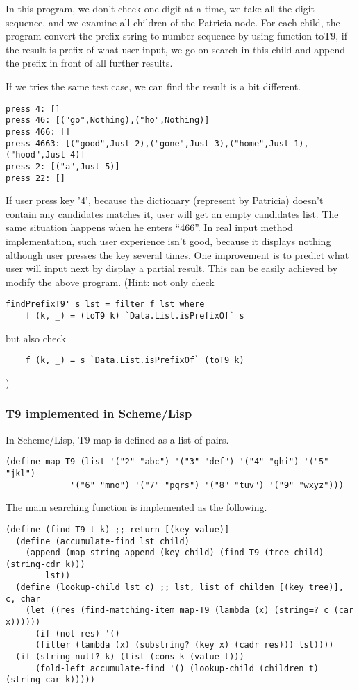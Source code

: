 \documentclass{article}
\begin{document}
In this program, we don't check one digit at a time, we take all the digit
sequence, and we examine all children of the Patricia node. For each child,
the program convert the prefix string to number sequence by using function
toT9, if the result is prefix of what user input, we go on search in this
child and append the prefix in front of all further results.

If we tries the same test case, we can find the result is a bit different.

\begin{verbatim}
press 4: []
press 46: [("go",Nothing),("ho",Nothing)]
press 466: []
press 4663: [("good",Just 2),("gone",Just 3),("home",Just 1),("hood",Just 4)]
press 2: [("a",Just 5)]
press 22: []
\end{verbatim}

If user press key '4', because the dictionary (represent by Patricia) doesn't
contain any candidates matches it, user will get an empty candidates list.
The same situation happens when he enters ``466''. In real input method
implementation, such user experience isn't good, because it displays nothing
although user presses the key several times. One improvement is to
predict what user will input next by display a partial result. This can be
easily achieved by modify the above program. (Hint: not only check
\begin{lstlisting}
findPrefixT9' s lst = filter f lst where
    f (k, _) = (toT9 k) `Data.List.isPrefixOf` s
\end{lstlisting}
but also check
\begin{lstlisting}
    f (k, _) = s `Data.List.isPrefixOf` (toT9 k)
\end{lstlisting}
)

\subsubsection*{T9 implemented in Scheme/Lisp}

In Scheme/Lisp, T9 map is defined as a list of pairs.

\lstset{language=lisp}
\begin{lstlisting}
(define map-T9 (list '("2" "abc") '("3" "def") '("4" "ghi") '("5" "jkl")
		     '("6" "mno") '("7" "pqrs") '("8" "tuv") '("9" "wxyz")))
\end{lstlisting}

The main searching function is implemented as the following.

\begin{lstlisting}
(define (find-T9 t k) ;; return [(key value)]
  (define (accumulate-find lst child)
    (append (map-string-append (key child) (find-T9 (tree child) (string-cdr k)))
	    lst))
  (define (lookup-child lst c) ;; lst, list of childen [(key tree)], c, char
    (let ((res (find-matching-item map-T9 (lambda (x) (string=? c (car x))))))
      (if (not res) '()
	  (filter (lambda (x) (substring? (key x) (cadr res))) lst))))
  (if (string-null? k) (list (cons k (value t)))
      (fold-left accumulate-find '() (lookup-child (children t) (string-car k)))))
\end{lstlisting}
\end{document}
